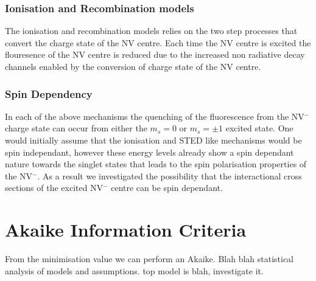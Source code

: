 \documentclass[prl]{revtex4}
\begin{document}
\subsubsection{Ionisation and Recombination models}
The ionisation and recombination models relies on the two step processes that convert the charge state of the NV centre. Each time the NV centre is excited the flouresence of the NV centre is reduced due to the increased non radiative decay channels enabled by the conversion of charge state of the NV centre.

\subsubsection{Spin Dependency}
In each of the above mechanisms the quenching of the fluorescence from the NV$^-$ charge state can occur from either the $m_s=0$ or $m_s=\pm1$ excited state. One would initially assume that the ionisation and STED like mechanisms would be spin independant, however these energy levels already show a spin dependant nature towards the singlet states that leads to the spin polarisation properties of the NV$^-$. As a result we investigated the possibility that the interactional cross sections of the excited NV$^-$ centre can be spin dependant.



\section{Akaike Information Criteria}
From the minimisation value we can perform an Akaike.
Blah blah statistical analysis of models and assumptions.
top model is blah, investigate it.
%




\begin{thebibliography}{27}






\end{thebibliography}
\end{document}
